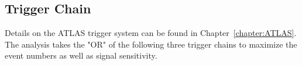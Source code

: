 




\subsection{Trigger Chain}
\label{section:trigger}
Details on the ATLAS trigger system can be found in Chapter~\ref{chapter:ATLAS}. The analysis takes the "OR" of the following three trigger chains to maximize the event numbers as well as signal sensitivity.

